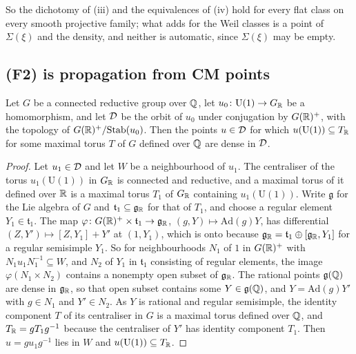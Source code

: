 So the dichotomy of (iii) and the equivalences of
(iv) hold for every flat class on every smooth projective
family; what  adds for the Weil classes is a point of
$\Sigma(\xi)$ and the density, and neither is automatic, since
$\Sigma(\xi)$ may be empty.

\subsection{(F2) is propagation from CM points}\label{ssec:f2cm}

\begin{lemma}\label{lem:cmdense}
Let $G$ be a connected reductive group over $\mathbb{Q}$, let
$u_{0}\colon\mathrm{U}(1)\to G_{\mathbb{R}}$ be a homomorphism, and let $\mathcal{D}$ be
the orbit of $u_{0}$ under conjugation by $G(\mathbb{R})^{+}$, with the topology of
$G(\mathbb{R})^{+}/\mathrm{Stab}(u_{0})$. Then the points $u\in\mathcal{D}$ for which
$u(\mathrm{U}(1))\subseteq T_{\mathbb{R}}$ for some maximal torus $T$ of $G$ defined
over $\mathbb{Q}$ are dense in $\mathcal{D}$.
\end{lemma}

\begin{proof}
Let $u_{1}\in\mathcal{D}$ and let $W$ be a neighbourhood of $u_{1}$. The centraliser
of the torus $u_{1}(\mathrm{U}(1))$ in $G_{\mathbb{R}}$ is connected and reductive,
and a maximal torus of it defined over $\mathbb{R}$ is a maximal torus $T_{1}$ of
$G_{\mathbb{R}}$ containing $u_{1}(\mathrm{U}(1))$. Write $\mathfrak{g}$ for the Lie
algebra of $G$ and $\mathfrak{t}_{1}\subseteq\mathfrak{g}_{\mathbb{R}}$ for that of
$T_{1}$, and choose a regular element $Y_{1}\in\mathfrak{t}_{1}$. The map
$\varphi\colon G(\mathbb{R})^{+}\times\mathfrak{t}_{1}\to\mathfrak{g}_{\mathbb{R}}$,
$(g,Y)\mapsto\mathrm{Ad}(g)Y$, has differential
$(Z,Y')\mapsto[Z,Y_{1}]+Y'$ at $(1,Y_{1})$, which is onto because
$\mathfrak{g}_{\mathbb{R}}=\mathfrak{t}_{1}\oplus[\mathfrak{g}_{\mathbb{R}},Y_{1}]$ for a
regular semisimple $Y_{1}$. So for neighbourhoods $N_{1}$ of $1$ in
$G(\mathbb{R})^{+}$ with $N_{1}u_{1}N_{1}^{-1}\subseteq W$, and $N_{2}$ of $Y_{1}$
in $\mathfrak{t}_{1}$ consisting of regular elements, the image
$\varphi(N_{1}\times N_{2})$ contains a nonempty open subset of
$\mathfrak{g}_{\mathbb{R}}$. The rational points $\mathfrak{g}(\mathbb{Q})$ are dense in
$\mathfrak{g}_{\mathbb{R}}$, so that open subset contains some
$Y\in\mathfrak{g}(\mathbb{Q})$, and $Y=\mathrm{Ad}(g)Y'$ with $g\in N_{1}$ and
$Y'\in N_{2}$. As $Y$ is rational and regular semisimple, the identity
component $T$ of its centraliser in $G$ is a maximal torus defined over
$\mathbb{Q}$, and $T_{\mathbb{R}}=gT_{1}g^{-1}$ because the centraliser of $Y'$ has
identity component $T_{1}$. Then $u=gu_{1}g^{-1}$ lies in $W$ and
$u(\mathrm{U}(1))\subseteq T_{\mathbb{R}}$.
\end{proof}

